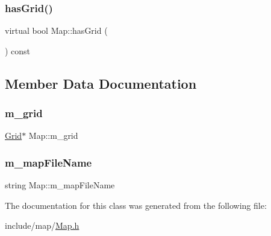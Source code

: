 \mbox{\label{class_map_aca471e63e8f9f9a892a5491aee94eada}} 
\subsubsection{\texorpdfstring{has\+Grid()}{hasGrid()}}
{\footnotesize\ttfamily virtual bool Map\+::has\+Grid (\begin{DoxyParamCaption}{ }\end{DoxyParamCaption}) const\hspace{0.3cm}{\ttfamily [virtual]}}



\subsection{Member Data Documentation}
\mbox{\label{class_map_a0fc16621dbe307d36170c3a96b24b7d9}} 
\subsubsection{\texorpdfstring{m\+\_\+grid}{m\_grid}}
{\footnotesize\ttfamily \hyperlink{class_grid}{Grid}$\ast$ Map\+::m\+\_\+grid\hspace{0.3cm}{\ttfamily [protected]}}

\mbox{\label{class_map_a54e527b86ef517e67b299ef06233addc}} 
\subsubsection{\texorpdfstring{m\+\_\+map\+File\+Name}{m\_mapFileName}}
{\footnotesize\ttfamily string Map\+::m\+\_\+map\+File\+Name\hspace{0.3cm}{\ttfamily [protected]}}



The documentation for this class was generated from the following file\+:\begin{DoxyCompactItemize}
\item 
include/map/\hyperlink{_map_8h}{Map.\+h}\end{DoxyCompactItemize}
